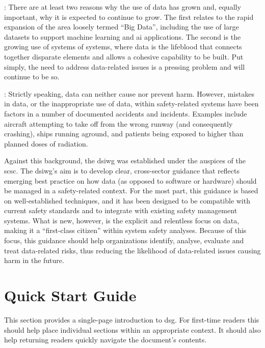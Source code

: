 : There are at least two reasons why the use of data has grown and, equally important, why it is expected to continue to grow. The  first relates to the rapid expansion of the area loosely termed ``Big Data'', including the use of large \glspl{dataset} to support machine learning and \gls{ai} applications. The second is the growing use of systems of systems, where data is the lifeblood that connects together disparate elements and allows a cohesive capability to be built. Put simply, the need to address data-related issues is a pressing problem and will continue to be so.

: Strictly speaking,
data can neither cause nor prevent harm.
However,  mistakes in data, or the inappropriate use of data, within safety-related systems have been factors in a number of documented accidents and incidents. Examples include aircraft attempting to take off from the wrong runway (and consequently crashing), ships running aground, and patients being exposed to higher than planned doses of radiation.

Against this background, the \gls{dsiwg} was established under the auspices of the \gls{scsc}. The \gls{dsiwg}'s aim is to develop clear, cross-sector guidance that reflects emerging best practice on how data (as opposed to software or hardware) should be managed in a safety-related context.
For the most part, this guidance is based on well-established techniques,
and it has been designed to be compatible with current safety standards and to integrate with existing safety management systems.
What is new, however, is the explicit and relentless focus on data, making it a ``first-class citizen'' within system safety analyses.
Because of this focus, this guidance should help organizations identify, analyse, evaluate and treat data-related risks, thus reducing the likelihood of data-related issues causing harm in the future.

\clearpage
\section*{Quick Start Guide}
\pagestyle{ContinuationPageFrontMatter}


This section provides a single-page introduction to \gls{dsg}. For first-time readers this should help place individual sections within an appropriate context. It should also help returning readers quickly navigate the document's contents.

